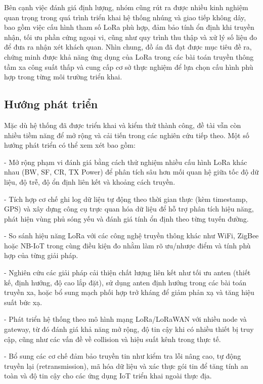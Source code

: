 \documentclass{article}
\begin{document}
	Bên cạnh việc đánh giá định lượng, nhóm cũng rút ra được nhiều kinh nghiệm quan trọng trong quá trình triển khai hệ thống nhúng và giao tiếp không dây, bao gồm việc cấu hình tham số LoRa phù hợp, đảm bảo tính ổn định khi truyền nhận, tối ưu phần cứng ngoại vi, cũng như quy trình thu thập và xử lý số liệu đo để đưa ra nhận xét khách quan. Nhìn chung, đồ án đã đạt được mục tiêu đề ra, chứng minh được khả năng ứng dụng của LoRa trong các bài toán truyền thông tầm xa công suất thấp và cung cấp cơ sở thực nghiệm để lựa chọn cấu hình phù hợp trong từng môi trường triển khai.
	
	\subsection*{Hướng phát triển}
	
	Mặc dù hệ thống đã được triển khai và kiểm thử thành công, đề tài vẫn còn nhiều tiềm năng để mở rộng và cải tiến trong các nghiên cứu tiếp theo. Một số hướng phát triển có thể xem xét bao gồm:
	
	- Mở rộng phạm vi đánh giá bằng cách thử nghiệm nhiều cấu hình LoRa khác nhau (BW, SF, CR, TX Power) để phân tích sâu hơn mối quan hệ giữa tốc độ dữ liệu, độ trễ, độ ổn định liên kết và khoảng cách truyền.
	
	- Tích hợp cơ chế ghi log dữ liệu tự động theo thời gian thực (kèm timestamp, GPS) và xây dựng công cụ trực quan hóa dữ liệu để hỗ trợ phân tích hiệu năng, phát hiện vùng phủ sóng yếu và đánh giá tính ổn định theo từng tuyến đường.
	
	- So sánh hiệu năng LoRa với các công nghệ truyền thông khác như WiFi, ZigBee hoặc NB-IoT trong cùng điều kiện đo nhằm làm rõ ưu/nhược điểm và tính phù hợp của từng giải pháp.
	
	- Nghiên cứu các giải pháp cải thiện chất lượng liên kết như tối ưu anten (thiết kế, định hướng, độ cao lắp đặt), sử dụng anten định hướng trong các bài toán truyền xa, hoặc bổ sung mạch phối hợp trở kháng để giảm phản xạ và tăng hiệu suất bức xạ.
	
	- Phát triển hệ thống theo mô hình mạng LoRa/LoRaWAN với nhiều node và gateway, từ đó đánh giá khả năng mở rộng, độ tin cậy khi có nhiều thiết bị truy cập, cũng như các vấn đề về collision và hiệu suất kênh trong thực tế.
	
	- Bổ sung các cơ chế đảm bảo truyền tin như kiểm tra lỗi nâng cao, tự động truyền lại (retransmission), mã hóa dữ liệu và xác thực gói tin để tăng tính an toàn và độ tin cậy cho các ứng dụng IoT triển khai ngoài thực địa.
	
	\newpage
	
	\renewcommand{\refname}{TÀI LIỆU THAM KHẢO}
	\nocite{*}
	
	
\end{document}
